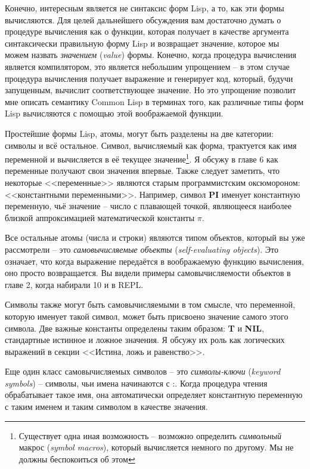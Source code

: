 Конечно, интересным является не синтаксис форм Lisp, а то, как эти формы вычисляются. Для
целей дальнейшего обсуждения вам достаточно думать о процедуре вычисления как о функции,
которая получает в качестве аргумента синтаксически правильную форму Lisp и возвращает
значение, которое мы можем назвать \textit{значением} (\textit{value}) формы. Конечно,
когда процедура вычисления является компилятором, это является небольшим упрощением -- в
этом случае процедура вычисления получает выражение и генерирует код, который, будучи
запущенным, вычислит соответствующее значение. Но это упрощение позволит мне описать
семантику Common Lisp в терминах того, как различные типы форм Lisp вычисляются с помощью
этой воображаемой функции.

Простейшие формы Lisp, атомы, могут быть разделены на две категории: символы и всё
остальное. Символ, вычисляемый как форма, трактуется как имя переменной и вычисляется в её
текущее значение\footnote{Существует одна иная возможность -- возможно определить
  \textit{символьный} макрос (\textit{symbol macros}), который вычисляется немного по
  другому. Мы не должны беспокоиться об этом}. Я обсужу в главе 6 как переменные получают
свои значения впервые. Также следует заметить, что некоторые <<переменные>> являются старым
программистским оксюмороном: <<константными переменными>>. Например, символ \textbf{PI}
именует константную переменную, чьё значение -- число с плавающей точкой, являющееся
наиболее близкой аппроксимацией математической константы $\pi$.

Все остальные атомы (числа и строки) являются типом объектов, который вы уже рассмотрели
-- это \textit{самовычисляемые объекты} (\textit{self-evaluating objects}). Это означает,
что когда выражение передаётся в воображаемую функцию вычисления, оно просто
возвращается. Вы видели примеры самовычисляемости объектов в главе 2, когда набирали 10 и
 в REPL.

Символы также могут быть самовычисляемыми в том смысле, что переменной, которую именует
такой символ, может быть присвоено значение самого этого символа. Две важные константы
определены таким образом: \textbf{T} и \textbf{NIL}, стандартные истинное и ложное
значения. Я обсужу их роль как логических выражений в секции <<Истина, ложь и равенство>>.

Еще один класс самовычисляемых символов -- это \textit{символы-ключи} (\textit{keyword
  symbols}) -- символы, чьи имена начинаются с :. Когда процедура чтения обрабатывает
такое имя, она автоматически определяет константную переменную с таким именем и таким
символом в качестве значения.

